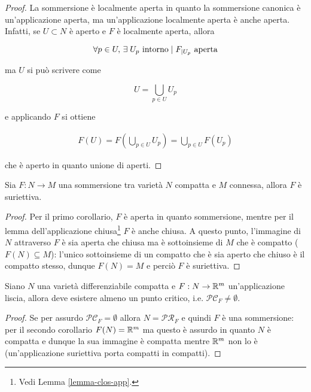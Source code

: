 \begin{proof}
	La sommersione è localmente aperta in quanto la sommersione canonica è un'applicazione aperta, ma un'applicazione localmente aperta è anche aperta. Infatti, se $ U \subset N $ è aperto e $ F $ è localmente aperta, allora
	
	\begin{equation}
		\forall p \in U, \, \exists \; U_{p} \text{ intorno} \mid F_{|U_{p}} \text{ aperta}
	\end{equation}

	ma $ U $ si può scrivere come
	
	\begin{equation}
		U = \bigcup_{p \in U} U_{p}
	\end{equation}

	e applicando $ F $ si ottiene
	
	\begin{align}
		F(U) = F \left( \bigcup_{p \in U} U_{p} \right) = \bigcup_{p \in U} F(U_{p})
	\end{align}

	che è aperto in quanto unione di aperti.
\end{proof}

\begin{corollary}[2]
	Sia $ F : N \to M $ una sommersione tra varietà $ N $ compatta e $ M $ connessa, allora $ F $ è suriettiva.
\end{corollary}

\begin{proof}
	Per il primo corollario, $ F $ è aperta in quanto sommersione, mentre per il lemma dell'applicazione chiusa\footnote{%
		Vedi Lemma \ref{lemma-clos-app}.%
	} $ F $ è anche chiusa. A questo punto, l'immagine di $ N $ attraverso $ F $ è sia aperta che chiusa ma è sottoinsieme di $ M $ che è compatto ($ F(N) \subseteq M $): l'unico sottoinsieme di un compatto che è sia aperto che chiuso è il compatto stesso, dunque $ F(N) = M $ e perciò $ F $ è suriettiva.
\end{proof}

\begin{corollary}[3]
	Siano $ N $ una varietà differenziabile compatta e $ F : N \to \mathbb{R}^{m} $ un'applicazione liscia, allora deve esistere almeno un punto critico, i.e. $ \mathcal{PC}_{F} \neq \emptyset $.
\end{corollary}

\begin{proof}
	Se per assurdo $ \mathcal{PC}_{F} = \emptyset $ allora $ N = \mathcal{PR}_{F} $ e quindi $ F $ è una sommersione: per il secondo corollario $ F(N) = \mathbb{R}^{m} $ ma questo è assurdo in quanto $ N $ è compatta e dunque la sua immagine è compatta mentre $ \mathbb{R}^{m} $ non lo è (un'applicazione suriettiva porta compatti in compatti).
\end{proof}

